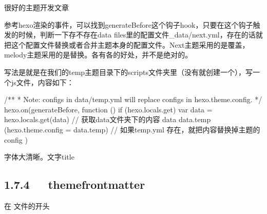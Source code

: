 \documentclass[letterpaper,12pt,english]{sphinxmanual}
\begin{document}
\begin{description}
\item[{}] \leavevmode
{}

\end{description}


很好的主题开发文章


参考hexo渲染的事件，可以找到generateBefore这个钩子hook，只要在这个钩子触发的时候，判断一下存不存在data files里的配置文件\_data/next.yml，存在的话就把这个配置文件替换或者合并主题本身的配置文件。Next主题采用的是覆盖，melody主题采用的是替换。各有各的好处，并不是绝对的。

写法是就是在我们的temp主题目录下的scripts文件夹里（没有就创建一个），写一个js文件，内容如下：

\begin{sphinxVerbatim}[commandchars=\\\{\}]
/**
 * Note: configs in \PYGZus{}data/temp.yml will replace configs in   hexo.theme.config.
 */
hexo.on(\PYGZsq{}generateBefore\PYGZsq{}, function () \PYGZob{}
  if (hexo.locals.get) \PYGZob{}
    var data = hexo.locals.get(\PYGZsq{}data\PYGZsq{}) // 获取\PYGZus{}data文件夹下的内容
    data \PYGZam{}\PYGZam{} data.temp \PYGZam{}\PYGZam{} (hexo.theme.config = data.temp) // 如果temp.yml   存在，就把内容替换掉主题的config
  \PYGZcb{}
\PYGZcb{})
\end{sphinxVerbatim}


字体大清晰。文字title



\subsection{1.7.4   theme\sphinxhyphen{}front\sphinxhyphen{}matter}
\label{\detokenize{001software/001install/001._u7f51_u7ad9/hexo:theme-front-matter}}
在  文件的开头
\end{document}
